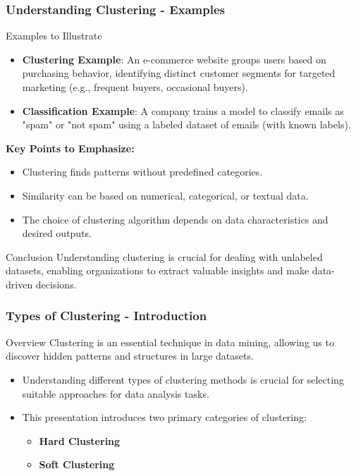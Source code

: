 \documentclass[aspectratio=169]{beamer}
\begin{document}
\begin{frame}[fragile]
    \frametitle{Understanding Clustering - Examples}
    \begin{block}{Examples to Illustrate}
        \begin{itemize}
            \item \textbf{Clustering Example}: 
            An e-commerce website groups users based on purchasing behavior, identifying distinct customer segments for targeted marketing (e.g., frequent buyers, occasional buyers).
            
            \item \textbf{Classification Example}:
            A company trains a model to classify emails as "spam" or "not spam" using a labeled dataset of emails (with known labels).
        \end{itemize}
    \end{block}

    \textbf{Key Points to Emphasize:}
    \begin{itemize}
        \item Clustering finds patterns without predefined categories.
        \item Similarity can be based on numerical, categorical, or textual data.
        \item The choice of clustering algorithm depends on data characteristics and desired outputs.
    \end{itemize}

    \begin{block}{Conclusion}
        Understanding clustering is crucial for dealing with unlabeled datasets, enabling organizations to extract valuable insights and make data-driven decisions. 
    \end{block}
\end{frame}

\begin{frame}[fragile]
    \frametitle{Types of Clustering - Introduction}
    \begin{block}{Overview}
        Clustering is an essential technique in data mining, allowing us to discover hidden patterns and structures in large datasets. 
    \end{block}
    
    \begin{itemize}
        \item Understanding different types of clustering methods is crucial for selecting suitable approaches for data analysis tasks.
        \item This presentation introduces two primary categories of clustering:
        \begin{itemize}
            \item \textbf{Hard Clustering}
            \item \textbf{Soft Clustering}
        \end{itemize}
    \end{itemize}
\end{frame}
\end{document}
